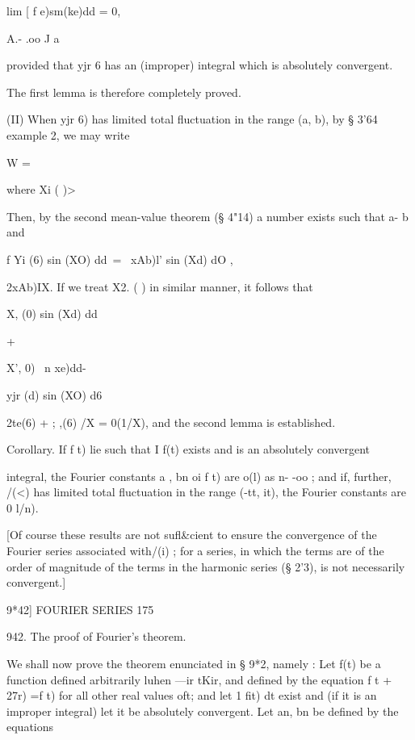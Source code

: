 lim [ f e)sm(ke)dd = 0, 

A.- .oo J a 

provided that yjr  6  has an (improper) integral which is absolutely convergent. 

The first lemma is therefore completely proved. 

(II) When yjr  6) has limited total fluctuation in the range (a, b), by § 3'64 
example 2, we may write 

 W = %

where Xi ( )> %

Then, by the second mean-value theorem (§ 4"14) a number   exists such 
that a-  b and 

f Yi (6) sin (XO) dd\ = \ xAb)l' sin (Xd) dO , 

 2xAb)IX. 
If we treat X2. ( ) in   similar manner, it follows that 



X, (0) sin (Xd) dd 



+ 



X', 0) \ n xe)dd- 



yjr (d) sin (XO) d6 

 2te(6) + ; ,(6) /X 
= 0(1/X), 
and the second lemma is established. 

Corollary. If f t) lie such that I f(t) exists and is an absolutely convergent 

integral, the Fourier constants a , bn oi f t) are o(l) as n- -oo ; and if, further, /(<) has 
limited total fluctuation in the range (-tt, it), the Fourier constants are 0 l/n). 

[Of course these results are not sufl\&cient to ensure the convergence of the Fourier 
series associated with/(i) ; for a series, in which the terms are of the order of magnitude 
of the terms in the harmonic series (§ 2'3), is not necessarily convergent.] 



9*42] FOURIER SERIES 175 

942. The proof of Fourier's theorem. 

We shall now prove the theorem enunciated in § 9*2, namely : 
Let f(t) be a function defined arbitrarily luhen —ir tKir, and defined by 
the equation f t + 27r) =f t) for all other real values oft; and let 1 fit) dt 
exist and (if it is an improper integral) let it be absolutely convergent. 
Let an, bn be defined by the equations 

